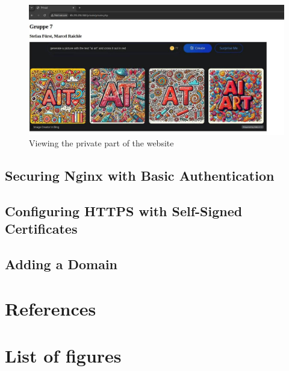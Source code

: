 \documentclass[a4paper]{article}
\newcommand{\abc}{\hfill \break}
\begin{document}
\begin{figure}[!htbp]
	\includegraphics[scale=0.2]{images/privatphp.png}
	\centering
	\caption{Viewing the private part of the website}
\end{figure}\abc\newpage
\subsection{Securing Nginx with Basic Authentication}

\subsection{Configuring HTTPS with Self-Signed Certificates}

\subsection{Adding a Domain}

\newpage
\section{References}

\newpage
\section{List of figures}

\listoffigures
\end{document}
